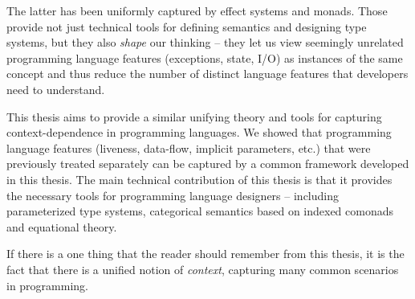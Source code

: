 The latter has been uniformly captured by effect systems and monads. Those provide not just
technical tools for defining semantics and designing type systems, but they also \emph{shape}
our thinking -- they let us view seemingly unrelated programming language features (exceptions,
state, I/O) as instances of the same concept and thus reduce the number of distinct language
features that developers need to understand.

This thesis aims to provide a similar unifying theory and tools for capturing context-dependence
in programming languages. We showed that programming language features (liveness, data-flow,
implicit parameters, etc.) that were previously treated separately can be captured by a common
framework developed in this thesis. The main technical contribution of this thesis is that it
provides the necessary tools for programming language designers -- including parameterized type
systems, categorical semantics based on indexed comonads and equational theory.

If there is a one thing that the reader should remember from this thesis, it is the fact that
there is a unified notion of \emph{context}, capturing many common scenarios in programming.
